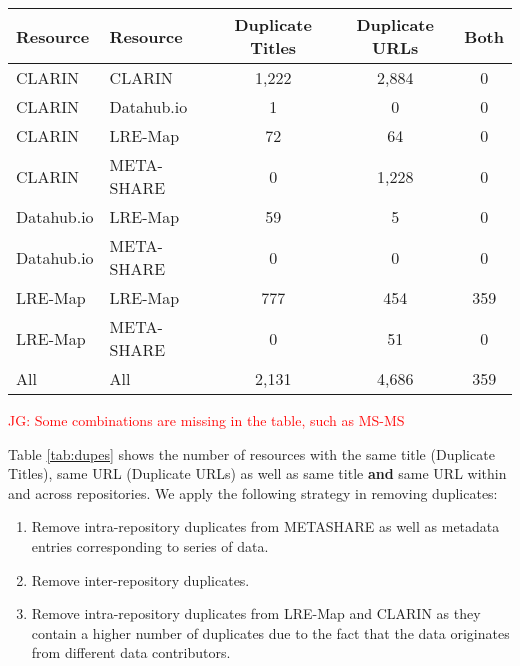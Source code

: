 \documentclass[11pt]{article}
\begin{document}
\begin{table*}
    \begin{center}
        \begin{tabular}{ll|ccc}
        Resource    & Resource    & Duplicate Titles & Duplicate URLs & Both \\
        \hline                                                                  
        CLARIN      & CLARIN      & 1,222            & 2,884          & 0    \\
        CLARIN      & Datahub.io  & 1                & 0              & 0    \\
        CLARIN      & LRE-Map     & 72               & 64             & 0    \\
        CLARIN      & META-SHARE  & 0                & 1,228          & 0    \\
        Datahub.io  & LRE-Map     & 59               & 5              & 0    \\
        Datahub.io  & META-SHARE  & 0                & 0              & 0    \\
        LRE-Map     & LRE-Map     & 777              & 454            & 359  \\
        LRE-Map     & META-SHARE  & 0                & 51             & 0    \\
        \hline
        All         & All         & 2,131            & 4,686          & 359  \\
        \end{tabular}
    \end{center}
    \caption{\label{tab:dupes}Number of candidate duplicate records by type}
\end{table*}

\textcolor{red}{JG: Some combinations are missing in the table, such as MS-MS}

Table \ref{tab:dupes} shows the number of resources with the same title (Duplicate Titles), same URL (Duplicate URLs) as well as same title \textbf{and} same URL within and across repositories. 
We apply the following strategy in removing duplicates:

\begin{enumerate}
\item Remove intra-repository duplicates from METASHARE as well as metadata entries corresponding to series of data.
\item Remove inter-repository duplicates.
\item Remove intra-repository duplicates from LRE-Map and CLARIN as they contain a higher number of duplicates due to the fact that the data originates from different data contributors.
\end{enumerate}
\end{document}
